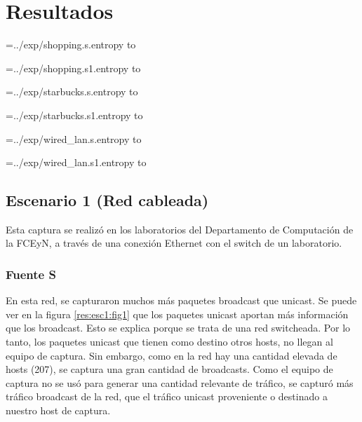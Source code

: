
\section{Resultados}

\newread\tmp

\openin\tmp=../exp/shopping.s.entropy
\read\tmp to \ShoppingSEntropy
\closein\tmp

\openin\tmp=../exp/shopping.s1.entropy
\read\tmp to \ShoppingSOneEntropy
\closein\tmp

\openin\tmp=../exp/starbucks.s.entropy
\read\tmp to \StarbucksSEntropy
\closein\tmp

\openin\tmp=../exp/starbucks.s1.entropy
\read\tmp to \StarbucksSOneEntropy
\closein\tmp

\openin\tmp=../exp/wired_lan.s.entropy
\read\tmp to \WiredLanSEntropy
\closein\tmp

\openin\tmp=../exp/wired_lan.s1.entropy
\read\tmp to \WiredLanSOneEntropy
\closein\tmp

\subsection{Escenario 1 (Red cableada)}

Esta captura se realizó en los laboratorios del Departamento de Computación de la FCEyN, a través de una conexión Ethernet con el switch de un laboratorio.

\subsubsection{Fuente S}

En esta red, se capturaron muchos más paquetes broadcast que unicast. Se puede ver en la figura \ref{res:esc1:fig1}
que los paquetes unicast aportan más información que los broadcast. Esto se explica porque se trata de una red switcheada. Por lo tanto, los paquetes unicast que tienen como destino otros hosts, no llegan al equipo de captura. Sin embargo, como en la red hay una cantidad elevada de hosts (207), se captura una gran cantidad de broadcasts. Como el equipo de captura no se usó para generar una cantidad relevante de tráfico, se capturó más tráfico broadcast de la red, que el tráfico unicast proveniente o destinado a nuestro host de captura.


